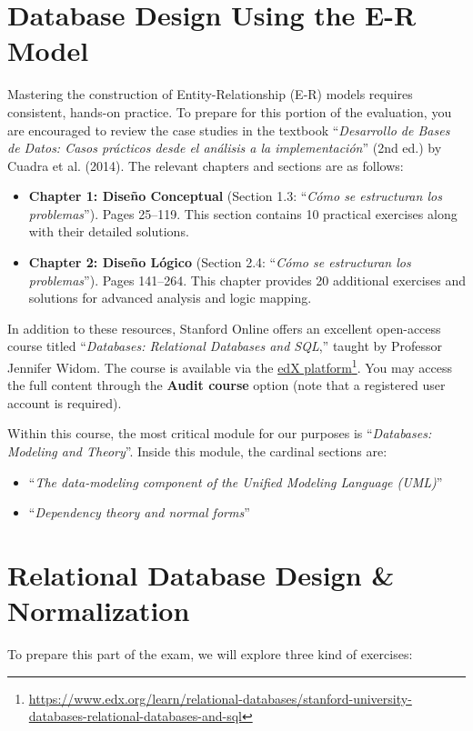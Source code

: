 \documentclass{article}
\begin{document}
\section{Database Design Using the E-R Model}

Mastering the construction of Entity-Relationship (E-R) models requires consistent, hands-on practice. To prepare for this portion of the evaluation, you are encouraged to review the case studies in the textbook ``\textit{Desarrollo de Bases de Datos: Casos prácticos desde el análisis a la implementación}'' (2nd ed.) by Cuadra et al. (2014). The relevant chapters and sections are as follows:

\begin{itemize}
    \item \textbf{Chapter 1: Diseño Conceptual} (Section 1.3: ``\textit{Cómo se estructuran los problemas}''). Pages 25--119. This section contains 10 practical exercises along with their detailed solutions.

    \item \textbf{Chapter 2: Diseño Lógico} (Section 2.4: ``\textit{Cómo se estructuran los problemas}''). Pages 141--264. This chapter provides 20 additional exercises and solutions for advanced analysis and logic mapping.
\end{itemize}

In addition to these resources, Stanford Online offers an excellent open-access course titled ``\textit{Databases: Relational Databases and SQL},'' taught by Professor Jennifer Widom. The course is available via the \href{https://www.edx.org/learn/relational-databases/stanford-university-databases-relational-databases-and-sql}{edX platform}\footnote{\url{https://www.edx.org/learn/relational-databases/stanford-university-databases-relational-databases-and-sql}}. You may access the full content through the \textbf{Audit course} option (note that a registered user account is required).

Within this course, the most critical module for our purposes is ``\textit{Databases: Modeling and Theory}''.  Inside this module, the cardinal sections are:

\begin{itemize}
    \item ``\textit{The data-modeling component of the Unified Modeling Language (UML)}''
    \item ``\textit{Dependency theory and normal forms}''
\end{itemize}

\section{Relational Database Design \& Normalization}
To prepare this part of the exam, we will explore three kind of exercises:
\end{document}

